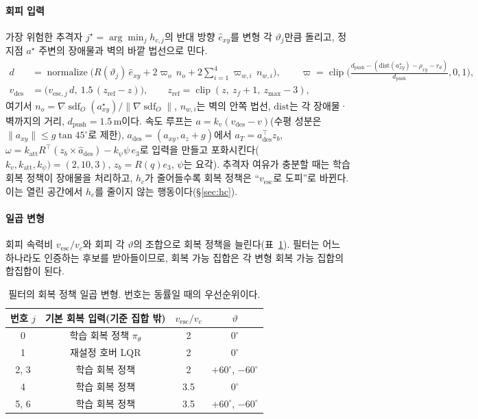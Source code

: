 \documentclass[10pt,a4paper]{article}
\newcommand{\clip}{\operatorname{clip}}
\newcommand{\sdf}{\operatorname{sdf}}
\newcommand{\nrm}{\operatorname{normalize}}
\begin{document}
\paragraph{회피 입력} 가장 위험한 추격자 $j^\star=\arg\min_jh_{c,j}$의 반대 방향 $\hat e_{xy}$를 변형 각 $\vartheta_j$만큼 돌리고, 정지점 $a^\star$ 주변의 장애물과 벽의 바깥 법선으로 민다.
\begin{align}
d&=\nrm\Big(R(\vartheta_j)\,\hat e_{xy}+2\varpi_o\,n_o+2\textstyle\sum_{i=1}^4\varpi_{w,i}\,n_{w,i}\Big),\qquad
\varpi=\clip\!\Big(\frac{d_{\mathrm{push}}-(\mathrm{dist}(a^\star_{xy})-\rho_{xy}-r_d)}{d_{\mathrm{push}}},0,1\Big),\\
v_{\mathrm{des}}&=\big(v_{\mathrm{esc},j}\,d,\ 1.5\,(z_{\mathrm{ref}}-z)\big),\qquad z_{\mathrm{ref}}=\clip(z,\ z_f+1,\ z_{\max}-3),
\end{align}
여기서 $n_o=\nabla\sdf_O(a^\star_{xy})/\|\nabla\sdf_O\|$, $n_{w,i}$는 벽의 안쪽 법선, $\mathrm{dist}$는 각 장애물·벽까지의 거리, $d_{\mathrm{push}}=1.5$\,m이다.
속도 루프는 $a=k_v(v_{\mathrm{des}}-v)$(수평 성분은 $\|a_{xy}\|\le g\tan45^\circ$로 제한), $a_{\mathrm{des}}=(a_{xy},a_z+g)$에서
$a_T=a_{\mathrm{des}}^\top z_b$, $\omega=k_{\mathrm{att}}R^\top(z_b\times\hat a_{\mathrm{des}})-k_\psi\psi\,e_3$로 입력을 만들고 포화시킨다($k_v,k_{\mathrm{att}},k_\psi)=(2,10,3)$, $z_b=R(q)e_3$, $\psi$는 요각).
추격자 여유가 충분할 때는 학습 회복 정책이 장애물을 처리하고, $h_c$가 줄어들수록 회복 정책은 ``$v_{\mathrm{esc}}$로 도피''로 바뀐다. 이는 열린 공간에서 $h_c$를 줄이지 않는 행동이다(\S\ref{sec:hc}).

\paragraph{일곱 변형} 회피 속력비 $v_{\mathrm{esc}}/v_c$와 회피 각 $\vartheta$의 조합으로 회복 정책을 늘린다(표~\ref{tab:variants}).
필터는 어느 하나라도 인증하는 후보를 받아들이므로, 회복 가능 집합은 각 변형 회복 가능 집합의 합집합이 된다.

\begin{table}[h]\centering\small
\caption{필터의 회복 정책 일곱 변형. 번호는 동률일 때의 우선순위이다.}\label{tab:variants}
\begin{tabular}{cccc}\toprule
번호 $j$ & 기본 회복 입력(기준 집합 밖) & $v_{\mathrm{esc}}/v_c$ & $\vartheta$ \\\midrule
0 & 학습 회복 정책 $\pi_\theta$ & 2 & $0^\circ$ \\
1 & 재설정 호버 LQR & 2 & $0^\circ$ \\
2, 3 & 학습 회복 정책 & 2 & $+60^\circ$, $-60^\circ$ \\
4 & 학습 회복 정책 & 3.5 & $0^\circ$ \\
5, 6 & 학습 회복 정책 & 3.5 & $+60^\circ$, $-60^\circ$ \\\bottomrule
\end{tabular}
\end{table}
\end{document}
